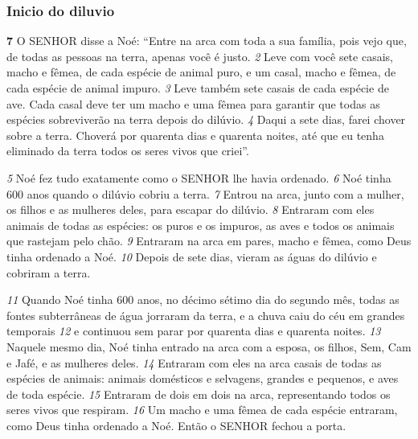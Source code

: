 \bigskip
\subsubsection*{Inicio do diluvio}
\textbf{\large 7}
 O SENHOR disse a Noé: “Entre na arca com toda a sua família, pois vejo que, de todas as pessoas na terra, apenas você é justo. 
\textit{\tiny 2}
 Leve com você sete casais, macho e fêmea, de cada espécie de animal puro, e um casal, macho e fêmea, de cada espécie de animal impuro. 
\textit{\tiny 3}
 Leve também sete casais de cada espécie de ave. Cada casal deve ter um macho e uma fêmea para garantir que todas as espécies sobreviverão na terra depois do dilúvio. 
\textit{\tiny 4}
 Daqui a sete dias, farei chover sobre a terra. Choverá por quarenta dias e quarenta noites, até que eu tenha eliminado da terra todos os seres vivos que criei”.



\bigskip
\textit{\tiny 5}
 Noé fez tudo exatamente como o SENHOR lhe havia ordenado. 
\textit{\tiny 6}
 Noé tinha 600 anos quando o dilúvio cobriu a terra. 
\textit{\tiny 7}
 Entrou na arca, junto com a mulher, os filhos e as mulheres deles, para escapar do dilúvio. 
\textit{\tiny 8}
 Entraram com eles animais de todas as espécies: os puros e os impuros, as aves e todos os animais que rastejam pelo chão. 
\textit{\tiny 9}
 Entraram na arca em pares, macho e fêmea, como Deus tinha ordenado a Noé. 
\textit{\tiny 10}
 Depois de sete dias, vieram as águas do dilúvio e cobriram a terra.



\bigskip
\textit{\tiny 11}
 Quando Noé tinha 600 anos, no décimo sétimo dia do segundo mês, todas as fontes subterrâneas de água jorraram da terra, e a chuva caiu do céu em grandes temporais 
\textit{\tiny 12}
 e continuou sem parar por quarenta dias e quarenta noites. 
\textit{\tiny 13}
 Naquele mesmo dia, Noé tinha entrado na arca com a esposa, os filhos, Sem, Cam e Jafé, e as mulheres deles. 
\textit{\tiny 14}
 Entraram com eles na arca casais de todas as espécies de animais: animais domésticos e selvagens, grandes e pequenos, e aves de toda espécie. 
\textit{\tiny 15}
 Entraram de dois em dois na arca, representando todos os seres vivos que respiram. 
\textit{\tiny 16}
 Um macho e uma fêmea de cada espécie entraram, como Deus tinha ordenado a Noé. 
Então o SENHOR fechou a porta. 

\bigskip
